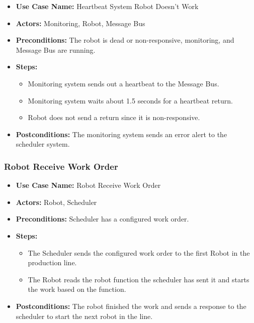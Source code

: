 \begin{itemize}
\item \textbf{Use Case Name:} Heartbeat System Robot Doesn't Work
\item \textbf{Actors:} Monitoring, Robot, Message Bus
\item \textbf{Preconditions:} The robot is dead or non-responsive, monitoring, and Message Bus are running.
\item \textbf{Steps:}
\begin{itemize}[label=--]
\item Monitoring system sends out a heartbeat to the Message Bus.
\item Monitoring system waits about 1.5 seconds for a heartbeat return.
\item Robot does not send a return since it is non-responsive.
\end{itemize}
\item \textbf{Postconditions:} The monitoring system sends an error alert to the scheduler system.
\end{itemize}
\vspace{1em}

\subsubsection{Robot Receive Work Order}
\label{sec:robot-receive-work-order}

\begin{itemize}
\item \textbf{Use Case Name:} Robot Receive Work Order
\item \textbf{Actors:} Robot, Scheduler
\item \textbf{Preconditions:} Scheduler has a configured work order.
\item \textbf{Steps:}
\begin{itemize}[label=--]
\item The Scheduler sends the configured work order to the first Robot in the production line.
\item The Robot reads the robot function the scheduler has sent it and starts the work based on the function.
\end{itemize}
\item \textbf{Postconditions:} The robot finished the work and sends a response to the scheduler to start the next robot in the line.
\end{itemize}
\vspace{1em} 


